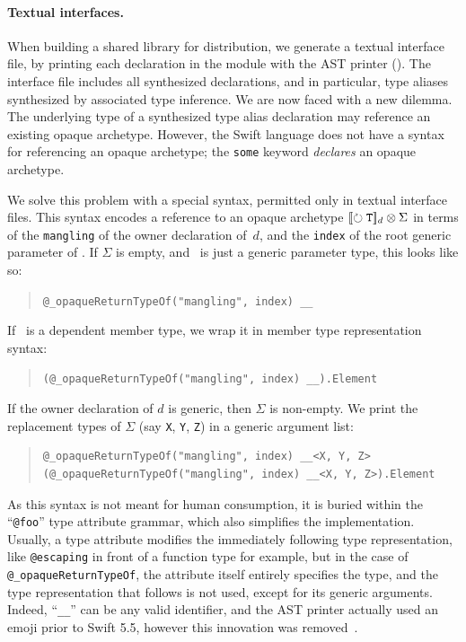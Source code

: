 \documentclass[../generics]{subfiles}
\begin{document}
\paragraph{Textual interfaces.}
When building a shared library for distribution, we generate a textual interface file, by printing each declaration in the module with the AST printer (). The interface file includes all synthesized declarations, and in particular, type aliases synthesized by associated type inference. We are now faced with a new dilemma. The underlying type of a synthesized type alias declaration may reference an existing opaque archetype. However, the Swift language does not have a syntax for referencing an opaque archetype; the \texttt{some} keyword \emph{declares} an opaque archetype.

We solve this problem with a special syntax, permitted only in textual interface files. This syntax encodes a reference to an opaque archetype $[\![\circlearrowright \texttt{\texttt{T}}]\!]_d \otimes \Sigma$ in terms of the \texttt{mangling} of the owner declaration of~$d$, and the \texttt{index} of the root generic parameter of \tT. If $\Sigma$ is empty, and \tT\ is just a generic parameter type, this looks like so:
\begin{quote}
\verb|@_opaqueReturnTypeOf("mangling", index) __|
\end{quote}
If \tT\ is a dependent member type, we wrap it in member type representation syntax:
\begin{quote}
\verb|(@_opaqueReturnTypeOf("mangling", index) __).Element|
\end{quote}
If the owner declaration of $d$ is generic, then $\Sigma$ is non-empty. We print the replacement types of $\Sigma$ (say \texttt{X}, \texttt{Y}, \texttt{Z}) in a generic argument list:
\begin{quote}
\begin{verbatim}
@_opaqueReturnTypeOf("mangling", index) __<X, Y, Z>
(@_opaqueReturnTypeOf("mangling", index) __<X, Y, Z>).Element
\end{verbatim}
\end{quote}
As this syntax is not meant for human consumption, it is buried within the ``\texttt{@foo}'' type attribute grammar, which also simplifies the implementation. Usually, a type attribute modifies the immediately following type representation, like \texttt{@escaping} in front of a function type for example, but in the case of \verb|@_opaqueReturnTypeOf|, the attribute itself entirely specifies the type, and the type representation that follows is not used, except for its generic arguments. Indeed, ``\verb|__|'' can be any valid identifier, and the AST printer actually used an emoji prior to Swift 5.5, however this innovation was removed~\cite{opaqueemoji}.
\end{document}
